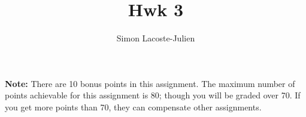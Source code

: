 \documentclass[12pt]{article}
\title{Hwk 3}
\author{Simon Lacoste-Julien}
\newcommand{\1}{{\bf 1}}
\begin{document}
\fancyhead{}
\fancyfoot{}





\textbf{Note:} There are 10 bonus points in this assignment. The maximum number of points achievable for this assignment is 80; though you will be graded over 70. If you get more points than 70, they can compensate other assignments.
\end{document}
